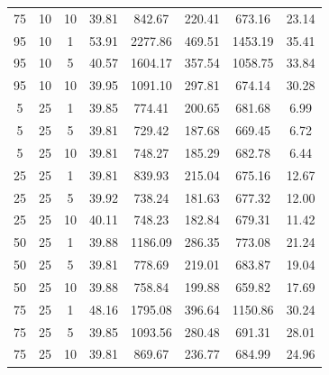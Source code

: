 \begin{table}[H]
\begin{tabular}{ccc|c|c|c|c|c}
75 & 10 & 10 & \cellcolor{gray!50}39.81 & \cellcolor{gray!31}842.67 & \cellcolor{gray!10}220.41 & \cellcolor{gray!46}673.16 & 23.14\\
95 & 10 & 1 & \cellcolor{gray!1}53.91 & \cellcolor{gray!1}2277.86 & \cellcolor{gray!1}469.51 & \cellcolor{gray!1}1453.19 & 35.41\\
95 & 10 & 5 & \cellcolor{gray!43}40.57 & \cellcolor{gray!1}1604.17 & \cellcolor{gray!1}357.54 & \cellcolor{gray!1}1058.75 & 33.84\\
95 & 10 & 10 & \cellcolor{gray!49}39.95 & \cellcolor{gray!1}1091.10 & \cellcolor{gray!1}297.81 & \cellcolor{gray!46}674.14 & 30.28\\
5 & 25 & 1 & \cellcolor{gray!50}39.85 & \cellcolor{gray!42}774.41 & \cellcolor{gray!28}200.65 & \cellcolor{gray!44}681.68 & 6.99\\
5 & 25 & 5 & \cellcolor{gray!50}39.81 & \cellcolor{gray!50}729.42 & \cellcolor{gray!40}187.68 & \cellcolor{gray!48}669.45 & 6.72\\
5 & 25 & 10 & \cellcolor{gray!50}39.81 & \cellcolor{gray!47}748.27 & \cellcolor{gray!42}185.29 & \cellcolor{gray!43}682.78 & 6.44\\
25 & 25 & 1 & \cellcolor{gray!50}39.81 & \cellcolor{gray!31}839.93 & \cellcolor{gray!15}215.04 & \cellcolor{gray!46}675.16 & 12.67\\
25 & 25 & 5 & \cellcolor{gray!49}39.92 & \cellcolor{gray!48}738.24 & \cellcolor{gray!46}181.63 & \cellcolor{gray!45}677.32 & 12.00\\
25 & 25 & 10 & \cellcolor{gray!48}40.11 & \cellcolor{gray!47}748.23 & \cellcolor{gray!45}182.84 & \cellcolor{gray!45}679.31 & 11.42\\
50 & 25 & 1 & \cellcolor{gray!50}39.88 & \cellcolor{gray!1}1186.09 & \cellcolor{gray!1}286.35 & \cellcolor{gray!16}773.08 & 21.24\\
50 & 25 & 5 & \cellcolor{gray!50}39.81 & \cellcolor{gray!42}778.69 & \cellcolor{gray!11}219.01 & \cellcolor{gray!43}683.87 & 19.04\\
50 & 25 & 10 & \cellcolor{gray!50}39.88 & \cellcolor{gray!45}758.84 & \cellcolor{gray!29}199.88 & \cellcolor{gray!50}659.82 & 17.69\\
75 & 25 & 1 & \cellcolor{gray!1}48.16 & \cellcolor{gray!1}1795.08 & \cellcolor{gray!1}396.64 & \cellcolor{gray!1}1150.86 & 30.24\\
75 & 25 & 5 & \cellcolor{gray!50}39.85 & \cellcolor{gray!1}1093.56 & \cellcolor{gray!1}280.48 & \cellcolor{gray!41}691.31 & 28.01\\
75 & 25 & 10 & \cellcolor{gray!50}39.81 & \cellcolor{gray!27}869.67 & \cellcolor{gray!1}236.77 & \cellcolor{gray!43}684.99 & 24.96\\

\end{tabular}
\end{table}
